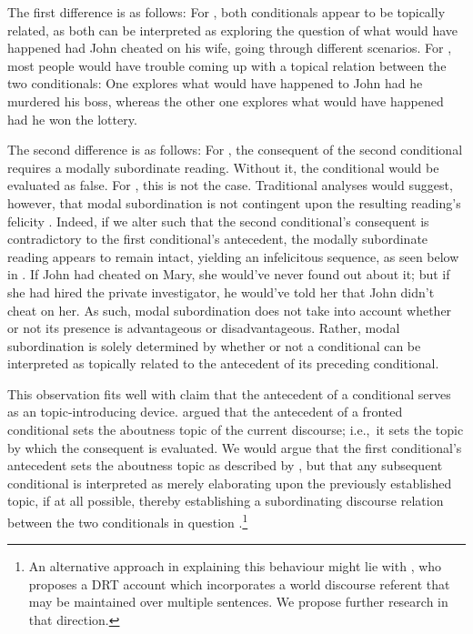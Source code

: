 The first difference is as follows: For , both conditionals appear to be topically related, as both can be interpreted as exploring the question of what would have happened had John cheated on his wife, going through different scenarios. For , most people would have trouble coming up with a topical relation between the two conditionals: One explores what would have happened to John had he murdered his boss, whereas the other one explores what would have happened had he won the lottery.

The second difference is as follows: For , the consequent of the second conditional requires a modally subordinate reading. Without it, the conditional would be evaluated as false. For , this is not the case. Traditional analyses would suggest, however, that modal subordination is not contingent upon the resulting reading's felicity \parencite{Roberts1987,Roberts1989}. Indeed, if we alter  such that the second conditional's consequent is contradictory to the first conditional's antecedent, the modally subordinate reading appears to remain intact, yielding an infelicitous sequence, as seen below in .
\ex{}
{}
If John had cheated on Mary, she would've never found out about it;\linebreak{} but if she had hired the private investigator, he would've told her that John didn't cheat on her.
\xe
As such, modal subordination does not take into account whether or not its presence is advantageous or disadvantageous. Rather, modal subordination is solely determined by whether or not a conditional can be interpreted as topically related to the antecedent of its preceding conditional.

This observation fits well with  claim that the antecedent of a conditional serves as an topic-introducing device. \textcite{Ebert2008,Ebert2014} argued that the antecedent of a fronted conditional sets the aboutness topic of the current discourse; i.e.,~it sets the topic by which the consequent is evaluated. We would argue that the first conditional's antecedent sets the aboutness topic as described by \textcite{Ebert2008,Ebert2014}, but that any subsequent conditional is interpreted as merely elaborating upon the previously established topic, if at all possible, thereby establishing a subordinating discourse relation between the two conditionals in question \parencite{Asher2005}.\footnote{An alternative approach in explaining this behaviour might lie with \textcite{Eckardt2021}, who proposes a DRT account which incorporates a world discourse referent that may be maintained over multiple sentences. We propose further research in that direction.}

